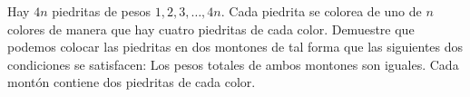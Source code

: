 Hay $4n$ piedritas de pesos $1, 2, 3, \dots , 4n$. Cada piedrita se colorea de uno de $n$ colores de manera que hay cuatro piedritas de cada color. Demuestre que podemos colocar las piedritas en dos montones de tal forma que las siguientes dos condiciones se satisfacen:
Los pesos totales de ambos montones son iguales. Cada montón contiene dos piedritas de cada color.